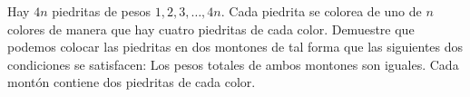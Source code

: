 Hay $4n$ piedritas de pesos $1, 2, 3, \dots , 4n$. Cada piedrita se colorea de uno de $n$ colores de manera que hay cuatro piedritas de cada color. Demuestre que podemos colocar las piedritas en dos montones de tal forma que las siguientes dos condiciones se satisfacen:
Los pesos totales de ambos montones son iguales. Cada montón contiene dos piedritas de cada color.